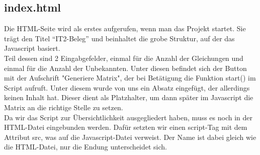 \documentclass[a4paper,oneside,titlepage,12pt]{article}
\begin{document}
\subsection{index.html}
Die HTML-Seite wird als erstes aufgerufen, wenn man das Projekt startet. Sie trägt den Titel ``IT2-Beleg'' und beinhaltet die grobe Struktur, auf der das Javascript basiert. \\ Teil dessen sind 2 Eingabgefelder, einmal für die Anzahl der Gleichungen und einmal für die Anzahl der Unbekannten. Unter diesen befindet sich der Button mit der Aufschrift "Generiere Matrix", der bei Betätigung die Funktion start() im Script aufruft. Unter diesem wurde von uns ein Absatz eingefügt, der allerdings keinen Inhalt hat. Dieser dient als Platzhalter, um dann später im Javascript die Matrix an die richtige Stelle zu setzen. \\ Da wir das Script zur Übersichtlichkeit ausgegliedert haben, muss es noch in der HTML-Datei eingebunden werden. Dafür setzten wir einen script-Tag mit dem Attribut src, was auf die Javascript-Datei verweist. Der Name ist dabei gleich wie die HTML-Datei, nur die Endung unterscheidet sich.
\end{document}
